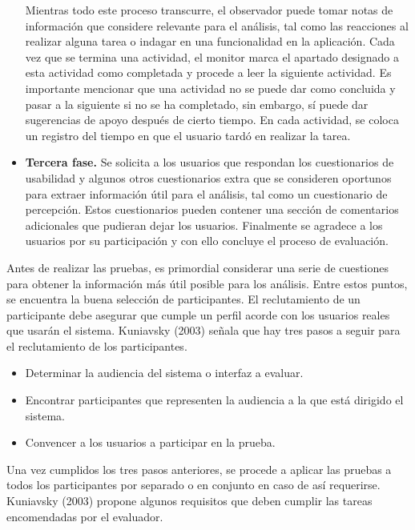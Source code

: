 \begin{itemize}
  Mientras todo este proceso transcurre, el observador puede tomar notas de información que considere relevante para el análisis, tal como las reacciones al realizar alguna tarea o indagar en una funcionalidad en la aplicación. Cada vez que se termina una actividad, el monitor marca el apartado designado a esta actividad como completada y procede a leer la siguiente actividad. Es importante mencionar que una actividad no se puede dar como concluida y pasar a la siguiente si no se ha completado, sin embargo, sí puede dar sugerencias de apoyo después de cierto tiempo. En cada actividad, se coloca un registro del tiempo en que el usuario tardó en realizar la tarea.
  \item \textbf{Tercera fase.} Se solicita a los usuarios que respondan los cuestionarios de usabilidad y algunos otros cuestionarios extra que se consideren oportunos para extraer información útil para el análisis, tal como un cuestionario de percepción. Estos cuestionarios pueden contener una sección de comentarios adicionales que pudieran dejar los usuarios. Finalmente se agradece a los usuarios por su participación y con ello concluye el proceso de evaluación.
\end{itemize}

Antes de realizar las pruebas, es primordial considerar una serie de cuestiones para obtener la información más útil posible para los análisis. Entre estos puntos, se encuentra la buena selección de participantes. El reclutamiento de un participante debe asegurar que cumple un perfil acorde con los usuarios reales que usarán el sistema. Kuniavsky (2003) señala que hay tres pasos a seguir para el reclutamiento de los participantes.

\begin{itemize}
  \item Determinar la audiencia del sistema o interfaz a evaluar.
  \item Encontrar participantes que representen la audiencia a la que está dirigido el sistema.
  \item Convencer a los usuarios a participar en la prueba.
\end{itemize}

Una vez cumplidos los tres pasos anteriores, se procede a aplicar las pruebas a todos los participantes por separado o en conjunto en caso de así requerirse. Kuniavsky (2003) propone algunos requisitos que deben cumplir las tareas encomendadas por el evaluador.

